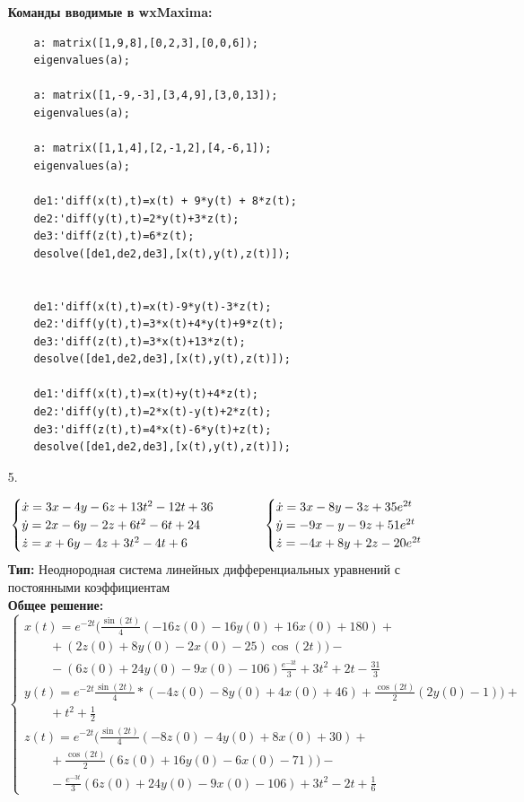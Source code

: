 \documentclass[a4paper, 12pt, oneside]{scrartcl}
\newcommand\tab[1][1cm]{\hspace*{#1}}
\begin{document}
\begin{enumerate}
		\textbf{Команды вводимые в wxMaxima: }
		\begin{verbatim}
	a: matrix([1,9,8],[0,2,3],[0,0,6]);
	eigenvalues(a);
	
	a: matrix([1,-9,-3],[3,4,9],[3,0,13]);
	eigenvalues(a);
	
	a: matrix([1,1,4],[2,-1,2],[4,-6,1]);
	eigenvalues(a);
   				
	de1:'diff(x(t),t)=x(t) + 9*y(t) + 8*z(t);
	de2:'diff(y(t),t)=2*y(t)+3*z(t);
	de3:'diff(z(t),t)=6*z(t);
	desolve([de1,de2,de3],[x(t),y(t),z(t)]);
	
	
	de1:'diff(x(t),t)=x(t)-9*y(t)-3*z(t);
	de2:'diff(y(t),t)=3*x(t)+4*y(t)+9*z(t);
	de3:'diff(z(t),t)=3*x(t)+13*z(t);
	desolve([de1,de2,de3],[x(t),y(t),z(t)]);
	
	de1:'diff(x(t),t)=x(t)+y(t)+4*z(t);
	de2:'diff(y(t),t)=2*x(t)-y(t)+2*z(t);
	de3:'diff(z(t),t)=4*x(t)-6*y(t)+z(t);
	desolve([de1,de2,de3],[x(t),y(t),z(t)]);
		\end{verbatim} 

		\item[5.]
	
	\begin{equation*}
	\begin{cases}
	\dot{x}=3x-4y-6z+13t^2 - 12t + 36
	\\
	\dot{y}=2x-6y-2z+6t^2-6t+24
	\\
	\dot{z}=x+6y-4z+3t^2-4t+6
	\end{cases}
	\tab
	\begin{cases}
	\dot{x}=3x-8y-3z+35e^{2t}
	\\
	\dot{y}=-9x-y-9z+51e^{2t}
	\\
	\dot{z}=-4x + 8y+2z-20e^{2t}
	\end{cases}
	\end{equation*}
	\textbf{Тип:}
	 Неоднородная система линейных  дифференциальных уравнений с постоянными коэффициентам  \\
	
	\textbf{Общее решение: }
	\begin{equation*}
	\begin{cases}
	x(t)=e^{-2t}(\frac{\sin(2t)}{4}(-16z(0)-16y(0)+16x(0)+180) + 
	\nonumber\\ \quad \quad  +(2z(0)+8y(0)-2x(0)-25)\cos(2t))-
	\nonumber\\ \quad \quad  -(6z(0)+24y(0)-9x(0)-106)\frac{e^{-3t}}{3}+3t^2+2t-\frac{31}{3}
\\
	y(t)=e^{-2t}\frac{\sin(2t)}{4}*(-4z(0)-8y(0)+4x(0)+46)+\frac{\cos(2t)}{2}(2y(0)-1))+
	\nonumber\\ \quad \quad+t^2+\frac{1}{2}
	\\
	z(t)=e^{-2t}(\frac{\sin(2t)}{4}(-8z(0)-4y(0)+8x(0)+30)+
	\nonumber\\ \quad \quad +\frac{\cos(2t)}{2}(6z(0)+16y(0)-6x(0)-71))-
	\nonumber\\ \quad \quad - \frac{e^{-3t}}{3}(6z(0)+24y(0)-9x(0)-106)+3t^2-2t+\frac{1}{6}
	\end{cases}
	\end{equation*}
	

\end{enumerate}
\end{document}
